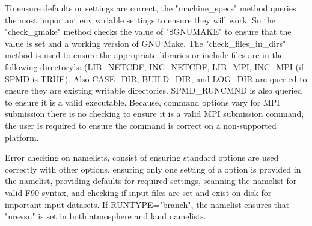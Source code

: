 \documentclass[]{article}
\begin{document}
To ensure defaults or settings are correct, the "machine\_specs" method queries the
most important env variable settings to ensure they will work. So the "check\_gmake"
method checks the value of "\$GNUMAKE" to ensure that the value is set and a working
version of GNU Make. The "check\_files\_in\_dirs" method is used to ensure the appropriate
libraries or include files are in the following directory's: (LIB\_NETCDF, INC\_NETCDF, 
LIB\_MPI, INC\_MPI (if SPMD is TRUE). Also CASE\_DIR, BUILD\_DIR, and LOG\_DIR are queried
to ensure they are existing writable directories. SPMD\_RUNCMND is also queried to ensure
it is a valid executable. Because, command options vary for MPI submission there is no
checking to ensure it is a valid MPI submission command, the user is required to ensure
the command is correct on a non-supported platform.

Error checking on namelists, consist of ensuring standard options are used correctly
with other options, ensuring only one setting of a option is provided in the namelist,
providing defaults for required settings, scanning the namelist for valid F90 syntax,
and checking if input files are set and exist on disk for important input datasets.
If RUNTYPE="branch", the namelist ensures that "nrevsn" is set in both atmosphere and land
namelists.
\end{document}
